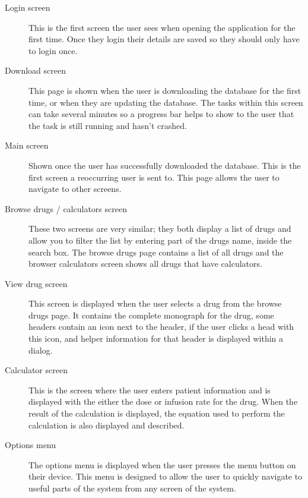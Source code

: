 \begin{description}
	\item[Login screen]
	This is the first screen the user sees when opening the application for the first time. Once they login their details are saved so they should only have to login once.
	\item[Download screen]
	This page is shown when the user is downloading the database for the first time, or when they are updating the database. The tasks within this screen can take several minutes so a progress bar helps to show to the user that the task is still running and hasn’t crashed.
	\item[Main screen]
	Shown once the user has successfully downloaded the database. This is the first screen a reoccurring user is sent to. This page allows the user to navigate to other screens.
	\item[Browse drugs / calculators screen]
	These two screens are very similar; they both display a list of drugs and allow you to filter the list by entering part of the drugs name, inside the search box. The browse drugs page contains a list of all drugs and the browser calculators screen shows all drugs that have calculators.
	\item[View drug screen]
	This screen is displayed when the user selects a drug from the browse drugs page. It contains the complete monograph for the drug, some headers contain an icon next to the header, if the user clicks a head with this icon, and helper information for that header is displayed within a dialog.
	\item[Calculator screen]
	This is the screen where the user enters patient information and is displayed with the either the dose or infusion rate for the drug. When the result of the calculation is displayed, the equation used to perform the calculation is also displayed and described.
	\item[Options menu]
	The options menu is displayed when the user presses the menu button on their device. This menu is designed to allow the user to quickly navigate to useful parts of the system from any screen of the system.
\end{description}


